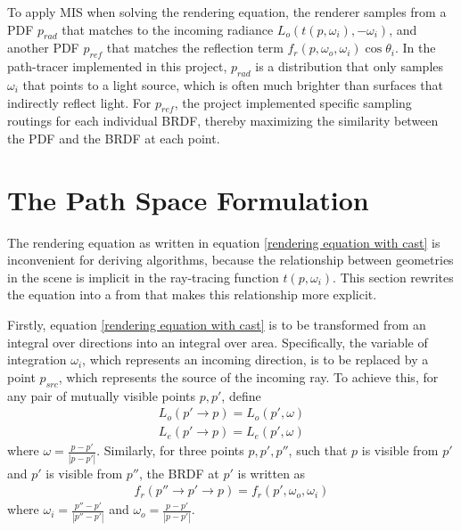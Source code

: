 To apply MIS when solving the rendering equation, the renderer samples from a PDF $p_{rad}$ that matches to the incoming radiance $L_o(t(p,\omega_i),-\omega_i)$, and another PDF $p_{ref}$ that matches the reflection term $f_r(p,\omega_o,\omega_i)\cos\theta_i$. In the path-tracer implemented in this project, $p_{rad}$ is a distribution that only samples $\omega_i$ that points to a light source, which is often much brighter than surfaces that indirectly reflect light. For $p_{ref}$, the project implemented specific sampling routings for each individual BRDF, thereby maximizing the similarity between the PDF and the BRDF at each point.


\section{The Path Space Formulation}
The rendering equation as written in equation \ref{rendering equation with cast} is inconvenient for deriving algorithms, because the relationship between geometries in the scene is implicit in the ray-tracing function $t(p,\omega_i)$. This section rewrites the equation into a from that makes this relationship more explicit.

Firstly, equation \ref{rendering equation with cast} is to be transformed from an integral over directions into an integral over area. Specifically, the variable of integration $\omega_i$, which represents an incoming direction, is to be replaced by a point $p_{src}$, which represents the source of the incoming ray. To achieve this, for any pair of mutually visible points $p,p'$, define 
\begin{align*}
    L_o(p'\to p) = L_o(p',\omega)\\
    L_e(p'\to p) = L_e(p',\omega)
\end{align*}
where $\omega = \frac{p-p'}{|p-p'|}$. Similarly, for three points $p,p',p''$, such that $p$ is visible from $p'$ and $p'$ is visible from $p''$, the BRDF at $p'$ is written as
\begin{align*}
    f_r(p''\to p'\to p) = f_r(p',\omega_o,\omega_i)
\end{align*} 
where $\omega_i = \frac{p''-p'}{|p''-p'|}$ and $\omega_o = \frac{p-p'}{|p-p'|}$.

